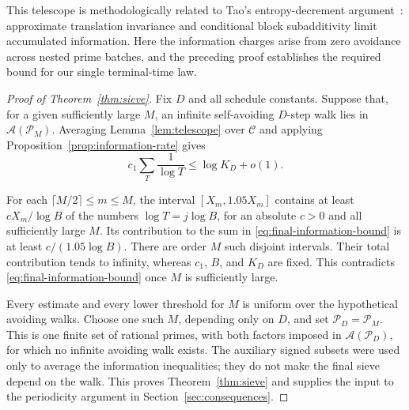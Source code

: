 This telescope is methodologically related to Tao's entropy-decrement
argument~\cite[Section~3, Equation~(40) and Lemma~17]{TaoEntropyDecrement}:
approximate translation invariance and conditional block subadditivity
limit accumulated information. Here the information charges arise from
zero avoidance across nested prime batches, and the preceding proof
establishes the required bound for our single terminal-time law.

\begin{proof}[Proof of Theorem~\ref{thm:sieve}]
Fix \(D\) and all schedule constants. Suppose that, for a given
sufficiently large \(M\), an infinite self-avoiding \(D\)-step walk
lies in \(\mathcal A(\mathcal P_M)\). Averaging
Lemma~\ref{lem:telescope} over \(\mathcal C\) and applying
Proposition~\ref{prop:information-rate} gives
\begin{equation}
 c_1\sum_T\frac1{\log T}\le\log K_D+o(1).
 \label{eq:final-information-bound}
\end{equation}

For each \(\lceil M/2\rceil\le m\le M\), the interval
\([X_m,1.05X_m]\) contains at least \(cX_m/\log B\) of the
numbers \(\log T=j\log B\), for an absolute \(c>0\) and all
sufficiently large \(M\). Its contribution to the sum in
\eqref{eq:final-information-bound} is at least
\(c/(1.05\log B)\). There are order \(M\) such disjoint
intervals. Their total contribution tends to infinity, whereas
\(c_1\), \(B\), and \(K_D\) are fixed. This contradicts
\eqref{eq:final-information-bound} once \(M\) is sufficiently large.

Every estimate and every lower threshold for \(M\) is uniform over
the hypothetical avoiding walks. Choose one such \(M\), depending
only on \(D\), and set \(\mathcal P_D=\mathcal P_M\). This is
one finite set of rational primes, with both factors imposed in
\(\mathcal A(\mathcal P_D)\), for which no infinite avoiding walk
exists. The auxiliary signed subsets were used only to average the
information inequalities; they do not make the final sieve depend on
the walk. This proves Theorem~\ref{thm:sieve} and supplies the input
to the periodicity argument in Section~\ref{sec:consequences}.
\end{proof}
